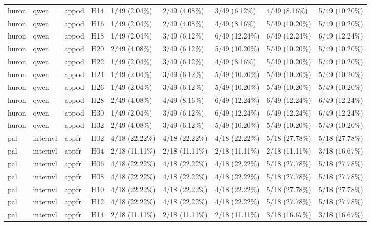 \begin{longtable}{lllllllll}
huron & qwen & appod & H14 & 1/49 (2.04\%) & 2/49 (4.08\%) & 3/49 (6.12\%) & 4/49 (8.16\%) & 5/49 (10.20\%) \\
huron & qwen & appod & H16 & 1/49 (2.04\%) & 2/49 (4.08\%) & 4/49 (8.16\%) & 5/49 (10.20\%) & 5/49 (10.20\%) \\
huron & qwen & appod & H18 & 1/49 (2.04\%) & 3/49 (6.12\%) & 6/49 (12.24\%) & 6/49 (12.24\%) & 6/49 (12.24\%) \\
huron & qwen & appod & H20 & 2/49 (4.08\%) & 3/49 (6.12\%) & 5/49 (10.20\%) & 5/49 (10.20\%) & 5/49 (10.20\%) \\
huron & qwen & appod & H22 & 1/49 (2.04\%) & 3/49 (6.12\%) & 4/49 (8.16\%) & 5/49 (10.20\%) & 5/49 (10.20\%) \\
huron & qwen & appod & H24 & 1/49 (2.04\%) & 3/49 (6.12\%) & 5/49 (10.20\%) & 5/49 (10.20\%) & 5/49 (10.20\%) \\
huron & qwen & appod & H26 & 1/49 (2.04\%) & 3/49 (6.12\%) & 5/49 (10.20\%) & 5/49 (10.20\%) & 5/49 (10.20\%) \\
huron & qwen & appod & H28 & 2/49 (4.08\%) & 4/49 (8.16\%) & 6/49 (12.24\%) & 6/49 (12.24\%) & 6/49 (12.24\%) \\
huron & qwen & appod & H30 & 1/49 (2.04\%) & 3/49 (6.12\%) & 6/49 (12.24\%) & 6/49 (12.24\%) & 6/49 (12.24\%) \\
huron & qwen & appod & H32 & 2/49 (4.08\%) & 3/49 (6.12\%) & 5/49 (10.20\%) & 5/49 (10.20\%) & 5/49 (10.20\%) \\
pal & internvl & appfr & H02 & 4/18 (22.22\%) & 4/18 (22.22\%) & 4/18 (22.22\%) & 5/18 (27.78\%) & 5/18 (27.78\%) \\
pal & internvl & appfr & H04 & 2/18 (11.11\%) & 2/18 (11.11\%) & 2/18 (11.11\%) & 2/18 (11.11\%) & 3/18 (16.67\%) \\
pal & internvl & appfr & H06 & 4/18 (22.22\%) & 4/18 (22.22\%) & 4/18 (22.22\%) & 5/18 (27.78\%) & 5/18 (27.78\%) \\
pal & internvl & appfr & H08 & 4/18 (22.22\%) & 4/18 (22.22\%) & 4/18 (22.22\%) & 5/18 (27.78\%) & 5/18 (27.78\%) \\
pal & internvl & appfr & H10 & 4/18 (22.22\%) & 4/18 (22.22\%) & 4/18 (22.22\%) & 5/18 (27.78\%) & 5/18 (27.78\%) \\
pal & internvl & appfr & H12 & 4/18 (22.22\%) & 4/18 (22.22\%) & 4/18 (22.22\%) & 5/18 (27.78\%) & 5/18 (27.78\%) \\
pal & internvl & appfr & H14 & 2/18 (11.11\%) & 2/18 (11.11\%) & 2/18 (11.11\%) & 3/18 (16.67\%) & 3/18 (16.67\%) \\

\end{longtable}
